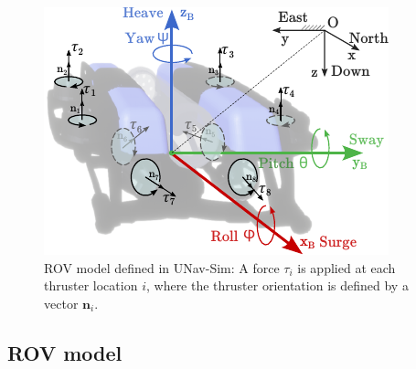 
\begin{figure}[!t]
    \centering
    \includegraphics[width=0.5\columnwidth]{Phd_thesis/figures/bluerov_fbd.pdf}
    \caption{ROV model defined in UNav-Sim: A force $\tau_i$ is applied at each thruster location $i$, where the thruster orientation is defined by a vector $\textbf{n}_i$.}
    \label{fig:rov_fbd}
\end{figure}

\subsection{ROV model }




